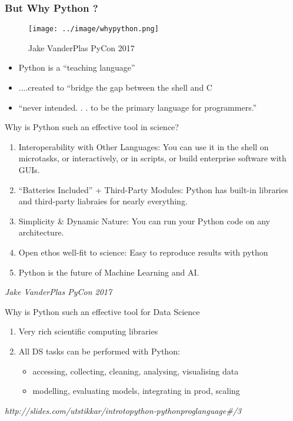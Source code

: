 \documentclass{bredelebeamer}
\begin{document}
\begin{frame}\frametitle{But Why Python ?}
\begin{multicols}{2}
\begin{figure}[h]
		\texttt{[image: ../image/whypython.png]}
		\label{fig:result1}
		\caption{Jake VanderPlas PyCon 2017}
\end{figure}
\columnbreak
\begin{itemize}
	\item Python is a “teaching language”
	\item ....created to “bridge the gap between the shell and C
	\item  “never intended. . . to be the primary language for programmers.”
\end{itemize}

\end{multicols}	
\end{frame}	

\begin{frame}{Why is Python such an effective tool in
science?}
\begin{enumerate}[<+>]
	\item Interoperability with Other Languages: You can use it in the shell on microtasks, or interactively, or in scripts, or build enterprise software with GUIs.
	\item “Batteries Included” + Third-Party Modules: Python has built-in libraries and third-party liabraies for nearly everything.
	\item Simplicity \& Dynamic Nature: You can run your Python code on any architecture.	
	\item Open ethos well-fit to science: Easy to reproduce results with python	
	\item Python is the future of Machine Learning and AI.
\end{enumerate}
\begin{center}	
\textit{Jake VanderPlas PyCon 2017}
\end{center}
\end{frame}

\begin{frame}{Why is Python such an effective tool for Data Science}
\begin{enumerate}[<+>]
	\item Very rich scientific computing libraries
    \item All DS tasks can be performed with Python:
    \begin{itemize} 
  \item accessing, collecting, cleaning, analysing, visualising data 
   \item modelling, evaluating models, integrating in prod, scaling
  \end{itemize}
\end{enumerate}
\begin{center}	
\textit{http://slides.com/utstikkar/introtopython-pythonproglanguage\#/3}
\end{center}
\end{frame}
\end{document}
